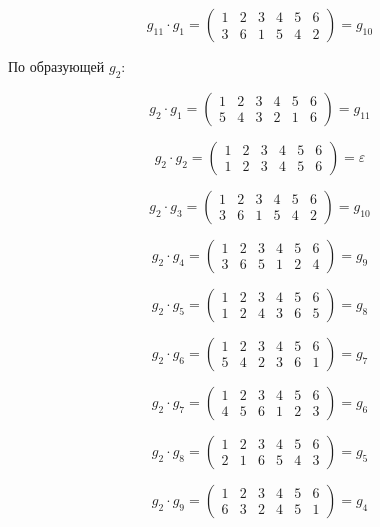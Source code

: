 \documentclass[utf8,14pt,a4paper,oneside,russian]{book}
\begin{document}
	\[ g_{11}\cdot g_{1} = \left( 
	\begin{array}{cccccc}
	1&2&3&4&5&6\\
	3&6&1&5&4&2
	\end{array} 
	\right) = g_{10} \]
	
	По образующей $g_{2}$:
	
	\[ g_{2}\cdot g_{1} = \left( 
	\begin{array}{cccccc}
	1&2&3&4&5&6\\
	5&4&3&2&1&6
	\end{array} 
	\right) = g_{11} \]
	
	\[ g_{2}\cdot g_{2} = \left( 
	\begin{array}{cccccc}
	1&2&3&4&5&6\\
	1&2&3&4&5&6
	\end{array} 
	\right) = \varepsilon \]
	
	\[ g_{2}\cdot g_{3} = \left( 
	\begin{array}{cccccc}
	1&2&3&4&5&6\\
	3&6&1&5&4&2
	\end{array} 
	\right) = g_{10} \]
	
	\[ g_{2}\cdot g_{4} = \left( 
	\begin{array}{cccccc}
	1&2&3&4&5&6\\
	3&6&5&1&2&4
	\end{array} 
	\right) = g_{9} \]
	
	\[ g_{2}\cdot g_{5} = \left( 
	\begin{array}{cccccc}
	1&2&3&4&5&6\\
	1&2&4&3&6&5
	\end{array} 
	\right) = g_{8} \]
	
	\[ g_{2}\cdot g_{6} = \left( 
	\begin{array}{cccccc}
	1&2&3&4&5&6\\
	5&4&2&3&6&1
	\end{array} 
	\right) = g_{7} \]
	
	\[ g_{2}\cdot g_{7} = \left( 
	\begin{array}{cccccc}
	1&2&3&4&5&6\\
	4&5&6&1&2&3
	\end{array} 
	\right) = g_{6} \]
	
	\[ g_{2}\cdot g_{8} = \left( 
	\begin{array}{cccccc}
	1&2&3&4&5&6\\
	2&1&6&5&4&3
	\end{array} 
	\right) = g_{5} \]
	
	\[ g_{2}\cdot g_{9} = \left( 
	\begin{array}{cccccc}
	1&2&3&4&5&6\\
	6&3&2&4&5&1
	\end{array} 
	\right) = g_{4} \]
	
\end{document}
